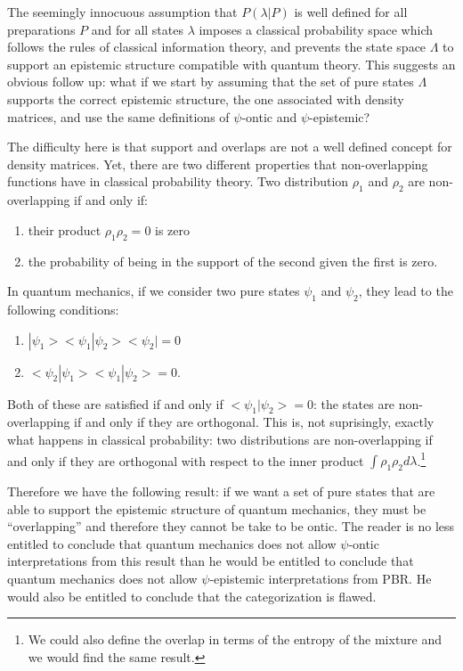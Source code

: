 \documentclass[10pt,twocolumn, nofootinbib]{revtex4-2}
\begin{document}
The seemingly innocuous assumption that $P(\lambda|P)$ is well defined for all preparations $P$ and for all states $\lambda$ imposes a classical probability space which follows the rules of classical information theory, and prevents the state space $\Lambda$ to support an epistemic structure compatible with quantum theory. This suggests an obvious follow up: what if we start by assuming that the set of pure states $\Lambda$ supports the correct epistemic structure, the one associated with density matrices, and use the same definitions of $\psi$-ontic and $\psi$-epistemic?

The difficulty here is that support and overlaps are not a well defined concept for density matrices. Yet, there are two different properties that non-overlapping functions have in classical probability theory. Two distribution $\rho_1$ and $\rho_2$ are non-overlapping if and only if:
\begin{enumerate}
	\item their product $\rho_1 \rho_2 = 0$ is zero
	\item the probability of being in the support of the second given the first is zero.
\end{enumerate}
In quantum mechanics, if we consider two pure states $\psi_1$ and $\psi_2$, they lead to the following conditions:
\begin{enumerate}
	\item $|\psi_1><\psi_1|\psi_2><\psi_2| = 0$
	\item $<\psi_2|\psi_1><\psi_1|\psi_2> = 0$.
\end{enumerate}
Both of these are satisfied if and only if $<\psi_1|\psi_2>=0$: the states are non-overlapping if and only if they are orthogonal. This is, not suprisingly, exactly what happens in classical probability: two distributions are non-overlapping if and only if they are orthogonal with respect to the inner product $\int \rho_1 \rho_2 d\lambda$.\footnote{We could also define the overlap in terms of the entropy of the mixture and we would find the same result.}

Therefore we have the following result: if we want a set of pure states that are able to support the epistemic structure of quantum mechanics, they must be ``overlapping'' and therefore they cannot be take to be ontic. The reader is no less entitled to conclude that quantum mechanics does not allow $\psi$-ontic interpretations from this result than he would be entitled to conclude that quantum mechanics does not allow $\psi$-epistemic interpretations from PBR. He would also be entitled to conclude that the categorization is flawed.
\end{document}
